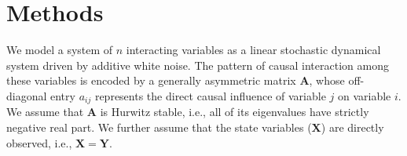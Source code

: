 \documentclass[12pt]{article}
\begin{document}



\section*{Methods}

We model a system of $n$ interacting variables as a linear
stochastic dynamical system driven by additive white noise.
The pattern of causal interaction among these variables is encoded by a generally asymmetric matrix $\mathbf{A}$, whose off-diagonal entry $a_{ij}$ represents the direct causal influence of variable $j$ on
variable $i$. We assume that $\mathbf{A}$ is Hurwitz stable, i.e., all of its eigenvalues have strictly
negative real part. We further assume that the state variables ($\mathbf{X}$) are directly observed, i.e., $\mathbf{X}=\mathbf{Y}$.
\end{document}
